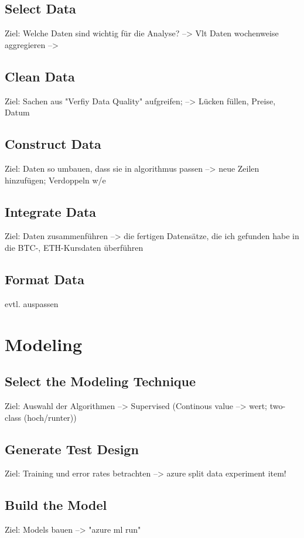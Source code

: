 \subsection{Select Data}
Ziel: Welche Daten sind wichtig für die Analyse?
--> Vlt Daten wochenweise aggregieren
--> 

\subsection{Clean Data}
Ziel: Sachen aus "Verfiy Data Quality" aufgreifen;
--> Lücken füllen, Preise, Datum

\subsection{Construct Data}
Ziel: Daten so umbauen, dass sie in algorithmus passen
--> neue Zeilen hinzufügen; Verdoppeln w/e

\subsection{Integrate Data}
Ziel: Daten zusammenführen
--> die fertigen Datensätze, die ich gefunden habe in die BTC-, ETH-Kursdaten überführen

\subsection{Format Data}
evtl. auspassen

\section{Modeling}
\subsection{Select the Modeling Technique}
Ziel: Auswahl der Algorithmen
--> Supervised (Continous value --> wert; two-class (hoch/runter))

\subsection{Generate Test Design}
Ziel: Training und error rates betrachten
--> azure split data experiment item!

\subsection{Build the Model}
Ziel: Models bauen
--> "azure ml run"

